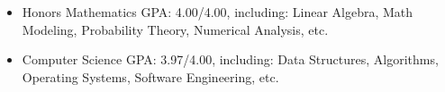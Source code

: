 
\begin{itemize}[nosep]
  \item Honors Mathematics GPA: 4.00/4.00, including:
  Linear Algebra, Math Modeling, Probability Theory, Numerical Analysis, etc.
  \item Computer Science GPA: 3.97/4.00, including:
  Data Structures, Algorithms, Operating Systems, Software Engineering, etc.
\end{itemize}
